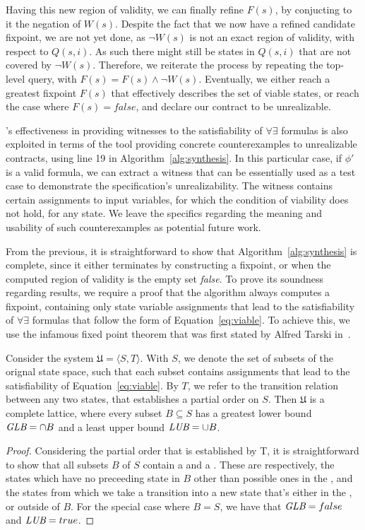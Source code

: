 Having this new region of validity, we can finally refine $F(s)$, by conjucting
to it the negation of $W(s)$. Despite the fact that we now have a refined
candidate fixpoint, we are not yet done, as $\lnot W(s)$ is not an exact region
of validity, with respect to $Q(s,i)$. As such there might still be states in
$Q(s,i)$ that are not covered by $\lnot W(s)$. Therefore, we reiterate the
process by repeating the top-level \aeval query, with $F(s) = F(s) \land \lnot
W(s)$. Eventually, we either reach a greatest fixpoint $F(s)$ that effectively
describes the set of viable states, or reach the case where $F(s) = false$, and
declare our contract to be unrealizable.

\aeval's effectiveness in providing witnesses to the
satisfiability of $\forall\exists$ formulas is also exploited in terms of the
tool providing concrete counterexamples to unrealizable contracts, using line 19
in Algorithm~\ref{alg:synthesis}. In this particular case, if $\phi'$ is a valid
formula, we can extract a witness that can be essentially used as a test case to
demonstrate the specification's unrealizability. The witness contains
certain assignments to input variables, for which the condition of viability does not
hold, for any state. We leave the specifics regarding the meaning and usability
of such counterexamples as potential future work.

From the previous, it is straightforward to show that
Algorithm~\ref{alg:synthesis} is complete, since it either terminates by
constructing a fixpoint, or when the computed region of validity is the empty
set \textit{false}. To prove its soundness regarding results, we require a
proof that the algorithm always computes a fixpoint, containing only state
variable assignments that lead to the satisfiability of $\forall\exists$
formulas that follow the form of Equation~\ref{eq:viable}. To achieve this, we
use the infamous fixed point theorem that was first stated by Alfred Tarski
in~\cite{tarski1955lattice}.

\begin{lemma} Consider the system
$\mathfrak{U} = \langle S, T \rangle$. With $S$, we denote the set of
subsets of the orignal state space, such that each subset contains assignments that lead to the
satisfiability of Equation~\ref{eq:viable}. By $T$, we refer to the
transition relation between any two states, that establishes a partial order
on $S$. Then $\mathfrak{U}$ is a complete lattice, where every subset $B \subseteq
S$ has a greatest lower bound  $\textit {GLB} = \cap B$  and a least upper
bound $\textit {LUB} = \cup B$.
\label{lem:lattice}
\end{lemma}
\begin{proof}
Considering the partial order that is established by T, it is straightforward
to show that all subsets $B$ of $S$ contain a \glb and a \lub. These
are respectively, the states which have no preceeding state in $B$ other than
possible ones in the \glb, and the states from which we take a transition into
a new state that's either in the \lub, or outside of $B$. For the special case
where $B = S$, we have that $\textit {GLB} = false$ and $\textit {LUB} = true$.
\end{proof}

